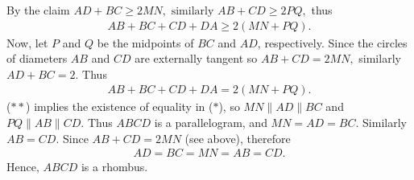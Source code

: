 \begin{multicols}{2}
	\vskip 0.1cm
	By the claim $AD+BC \ge 2MN, \text{\ similarly\ } AB+CD \ge 2PQ,$ thus 
	\begin{align*}
		AB\!+\!BC\!+\!CD\!+\!DA \!\ge\! 2(MN+PQ). \tag{$*$}
	\end{align*}
	Now, let $P$ and $Q$ be the midpoints of $BC$ and $AD$, respectively.
	Since the circles of diameters $AB$ and $CD$ are externally tangent so $AB+CD = 2MN,$ similarly $AD+BC = 2.$
	Thus 
	\begin{align*}
		AB\!+\!BC\!+\!CD\!+\!DA \!=\! 2(MN+PQ). \tag{$**$} 
	\end{align*}	
	($**$) implies the existence of equality in ($*$), so $MN \parallel AD \parallel BC$ and $PQ \parallel AB \parallel CD$.
	Thus $ABCD$ is a parallelogram, and $MN = AD = BC.$ Similarly $AB=CD.$ Since $AB +CD = 2MN$ (see above), therefore
	\begin{align*}
		AD = BC = MN = AB = CD.
	\end{align*}
	Hence, $ABCD$ is a rhombus.
\end{multicols}
